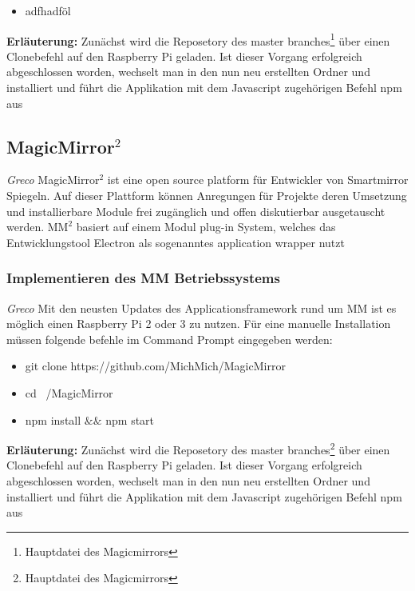 \documentclass[12pt,a4paper]{report}
\begin{document}
\begin{itemize}
	\item adfhadföl
\end{itemize}
\textbf{Erläuterung:}
Zunächst wird die Reposetory des master branches\footnote{Hauptdatei des Magicmirrors} über einen Clonebefehl auf den Raspberry Pi geladen. Ist dieser Vorgang erfolgreich abgeschlossen worden, wechselt man in den nun neu erstellten Ordner und installiert und führt die Applikation mit dem Javascript zugehörigen Befehl npm aus 



\subsection*{MagicMirror$^2$}
\textit{Greco}
MagicMirror$^2$ ist eine open source platform für Entwickler von Smartmirror Spiegeln. Auf dieser Plattform können Anregungen für Projekte deren Umsetzung und installierbare Module frei zugänglich und offen diskutierbar ausgetauscht werden. $\text{MM}^{2}$ basiert auf einem Modul plug-in System, welches das Entwicklungstool Electron als sogenanntes application wrapper nutzt 
\subsubsection{Implementieren des MM Betriebssystems}
\textit{Greco}
Mit den neusten Updates des Applicationsframework rund um MM ist es möglich einen Raspberry Pi 2 oder 3 zu nutzen. Für eine manuelle Installation müssen folgende befehle im Command Prompt eingegeben werden:
 
 \begin{itemize}
	\item git clone https://github.com/MichMich/MagicMirror
	\item cd ~/MagicMirror
	\item npm install $\&\&$ npm start
 \end{itemize}
\textbf{Erläuterung:}
Zunächst wird die Reposetory des master branches\footnote{Hauptdatei des Magicmirrors} über einen Clonebefehl auf den Raspberry Pi geladen. Ist dieser Vorgang erfolgreich abgeschlossen worden, wechselt man in den nun neu erstellten Ordner und installiert und führt die Applikation mit dem Javascript zugehörigen Befehl npm aus 
\end{document}
